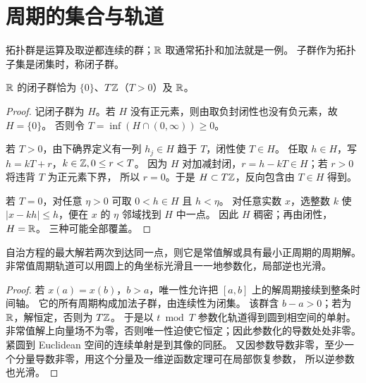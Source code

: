 \section{周期的集合与轨道}

\begin{definition}[拓扑群与闭子群]
拓扑群是运算及取逆都连续的群；$\mathbb{R}$ 取通常拓扑和加法就是一例。
子群作为拓扑子集是闭集时，称闭子群。

\end{definition}

\begin{lemma}
$\mathbb{R}$ 的闭子群恰为 $\{0\}$、$T\mathbb{Z}$（$T>0$）及 $\mathbb{R}$。
\end{lemma}
\begin{proof}
记闭子群为 $H$。若 $H$ 没有正元素，则由取负封闭性也没有负元素，故 $H=\{0\}$。
否则令 $T=\inf(H\cap(0,\infty))\geq0$。

若 $T>0$，由下确界定义有一列 $h_j\in H$ 趋于 $T$，闭性使 $T\in H$。
任取 $h\in H$，写 $h=kT+r$，$k\in\mathbb{Z},0\leq r<T$。
因为 $H$ 对加减封闭，$r=h-kT\in H$；若 $r>0$ 将违背 $T$ 为正元素下界，
所以 $r=0$。于是 $H\subset T\mathbb{Z}$，反向包含由 $T\in H$ 得到。

若 $T=0$，对任意 $\eta>0$ 可取 $0<h\in H$ 且 $h<\eta$。
对任意实数 $x$，选整数 $k$ 使 $|x-kh|\leq h$，便在 $x$ 的 $\eta$ 邻域找到 $H$ 中一点。
因此 $H$ 稠密；再由闭性，$H=\mathbb{R}$。
三种可能全部覆盖。
\end{proof}
\begin{theorem}
自治方程的最大解若两次到达同一点，则它是常值解或具有最小正周期的周期解。
非常值周期轨道可以用圆上的角坐标光滑且一一地参数化，局部逆也光滑。
\end{theorem}
\begin{proof}
若 $x(a)=x(b)$，$b>a$，唯一性允许把 $[a,b]$ 上的解周期接续到整条时间轴。
它的所有周期构成加法子群，由连续性为闭集。
该群含 $b-a>0$；若为 $\mathbb{R}$，解恒定，否则为 $T\mathbb{Z}$。
于是以 $t\bmod T$ 参数化轨道得到圆到相空间的单射。
非常值解上向量场不为零，否则唯一性迫使它恒定；因此参数化的导数处处非零。
紧圆到 Euclidean 空间的连续单射是到其像的同胚。
又因参数导数非零，至少一个分量导数非零，用这个分量及一维逆函数定理可在局部恢复参数，
所以逆参数也光滑。
\end{proof}
